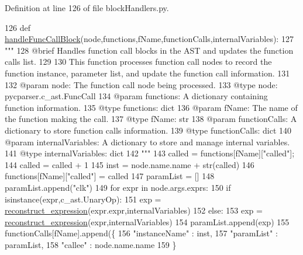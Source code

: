 Definition at line 126 of file block\+Handlers.\+py.


\begin{DoxyCode}
126 \textcolor{keyword}{def }\hyperlink{namespaceblockHandlers_ac034bd474478ead202ae756242b4348c}{handleFuncCallBlock}(node,functions,fName,functionCalls,internalVariables):
127     \textcolor{stringliteral}{"""
}
128 \textcolor{stringliteral}{    @brief Handles function call blocks in the AST and updates the function calls list.
}
129 \textcolor{stringliteral}{
}
130 \textcolor{stringliteral}{    This function processes function call nodes to record the function instance, parameter list, and update
       the function call information.
}
131 \textcolor{stringliteral}{
}
132 \textcolor{stringliteral}{    @param node: The function call node being processed.
}
133 \textcolor{stringliteral}{    @type node: pycparser.c\_ast.FuncCall
}
134 \textcolor{stringliteral}{    @param functions: A dictionary containing function information.
}
135 \textcolor{stringliteral}{    @type functions: dict
}
136 \textcolor{stringliteral}{    @param fName: The name of the function making the call.
}
137 \textcolor{stringliteral}{    @type fName: str
}
138 \textcolor{stringliteral}{    @param functionCalls: A dictionary to store function calls information.
}
139 \textcolor{stringliteral}{    @type functionCalls: dict
}
140 \textcolor{stringliteral}{    @param internalVariables: A dictionary to store and manage internal variables.
}
141 \textcolor{stringliteral}{    @type internalVariables: dict
}
142 \textcolor{stringliteral}{    """}
143     called = functions[fName][\textcolor{stringliteral}{"called"}];
144     called = called + 1
145     inst = node.name.name + str(called)
146     functions[fName][\textcolor{stringliteral}{"called"}] = called
147     paramList = []
148     paramList.append(\textcolor{stringliteral}{"clk"})
149     \textcolor{keywordflow}{for} expr \textcolor{keywordflow}{in} node.args.exprs:
150         \textcolor{keywordflow}{if} isinstance(expr,c\_ast.UnaryOp):
151             exp = \hyperlink{namespaceblockHandlers_a5dcb5985c58176982a44686f616daa7f}{reconstruct\_expression}(expr.expr,internalVariables)
152         \textcolor{keywordflow}{else}:
153             exp = \hyperlink{namespaceblockHandlers_a5dcb5985c58176982a44686f616daa7f}{reconstruct\_expression}(expr,internalVariables)
154         paramList.append(exp)
155     functionCalls[fName].append(\{
156         \textcolor{stringliteral}{"instanceName"} : inst,
157         \textcolor{stringliteral}{"paramList"} : paramList,
158         \textcolor{stringliteral}{"callee"} : node.name.name
159     \}
\end{DoxyCode}
